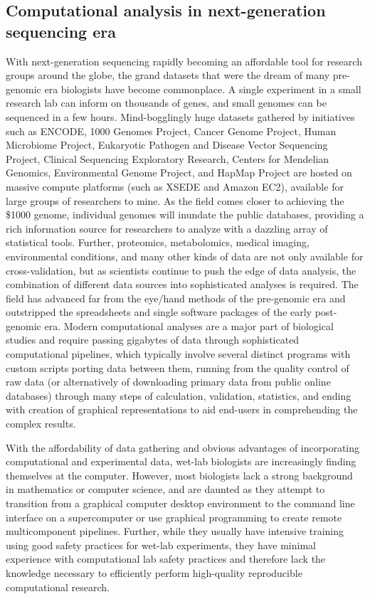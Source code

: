 \documentclass[ChapterTOCs,krantz2]{krantz} %
\begin{document}
\subsection{Computational analysis in next-generation sequencing era}

With next-generation sequencing rapidly becoming an affordable tool
for research groups around the globe, the grand datasets that were the
dream of many pre-genomic era biologists have become commonplace.  A single
experiment in a small research lab can inform on
thousands of genes, and small genomes can be sequenced in a few hours.
Mind-bogglingly huge datasets gathered by initiatives such as ENCODE\cite{Encode2004,Myers2011}, 
1000 Genomes Project\cite{Altshuler2010}, 
Cancer Genome Project\cite{Cosmic2011}, Human Microbiome Project\cite{Lewis2012}, 
Eukaryotic Pathogen and Disease Vector Sequencing Project\cite{EPDVSP}, 
Clinical Sequencing Exploratory Research\cite{CSER}, 
Centers for Mendelian Genomics\cite{CMG}, Environmental Genome Project\cite{EGP}, 
and HapMap Project\cite{IHP} are hosted on
massive compute platforms
(such as XSEDE\cite{Xsede} and Amazon EC2\cite{AEC2}), available for large groups of 
researchers to mine.  As the field comes closer to achieving the 
\$1000 genome, individual genomes will inundate the 
public databases, providing a rich information source for
researchers to analyze with a dazzling array of statistical tools.  Further,
proteomics, metabolomics, medical imaging, environmental conditions, and many
other kinds of data are not only available for cross-validation, but as
scientists continue to push the edge of data analysis, the combination of
different data sources into sophisticated analyses is required.  The field has
advanced far from the eye/hand methods of the pre-genomic era and outstripped
the spreadsheets and single software packages of the early post-genomic era.  
Modern computational analyses are a major part of biological studies
and require passing gigabytes of data through sophisticated computational
pipelines, which typically involve several distinct programs with custom
scripts porting data between them, running from the quality control of raw data
(or alternatively of downloading primary data from public online databases)
through many steps of calculation, validation, statistics, and ending with
creation of graphical representations to aid end-users in comprehending the
complex results.

With the affordability of data gathering and obvious advantages of
incorporating computational and experimental data, wet-lab biologists are
increasingly finding themselves at the computer.  
However, most biologists lack a strong background in mathematics or
computer science, and are daunted as they attempt to transition from a graphical
computer desktop environment to the command line interface on a 
supercomputer or use graphical programming to create remote 
multicomponent pipelines.  Further, while they
usually have intensive training using good safety practices 
for wet-lab experiments, they have minimal experience with computational 
lab safety practices and therefore lack the knowledge necessary to 
efficiently perform high-quality reproducible 
computational research.
\end{document}
